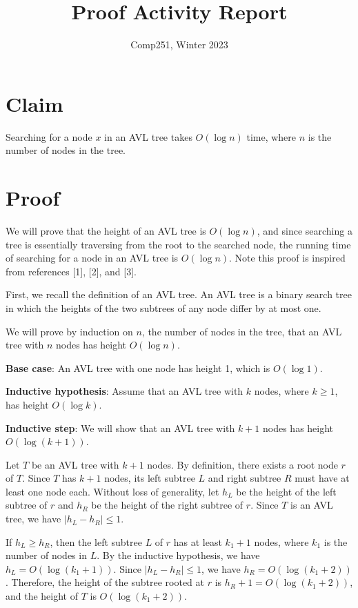 \documentclass[12pt]{article}
\title{Proof Activity Report}
\author{}
\date{Comp251, Winter 2023}
\begin{document}
\maketitle

\section*{Claim}
Searching for a node $x$ in an AVL tree takes $O(\log n)$ time, where $n$ is the number of nodes in the tree.

\section*{Proof}

We will prove that the height of an AVL tree is $O(\log n)$, and since searching a tree is essentially traversing from the root to the searched node, the running time of searching for a node in an AVL tree is $O(\log n)$. Note this proof is inspired from references [1], [2], and [3].

First, we recall the definition of an AVL tree. An AVL tree is a binary search tree in which the heights of the two subtrees of any node differ by at most one.

We will prove by induction on $n$, the number of nodes in the tree, that an AVL tree with $n$ nodes has height $O(\log n)$.

\textbf{Base case}: An AVL tree with one node has height 1, which is $O(\log 1)$.

\textbf{Inductive hypothesis}: Assume that an AVL tree with $k$ nodes, where $k\geq 1$, has height $O(\log k)$.

\textbf{Inductive step}: We will show that an AVL tree with $k+1$ nodes has height $O(\log (k+1))$.

Let $T$ be an AVL tree with $k+1$ nodes. By definition, there exists a root node $r$ of $T$. Since $T$ has $k+1$ nodes, its left subtree $L$ and right subtree $R$ must have at least one node each. Without loss of generality, let $h_L$ be the height of the left subtree of $r$ and $h_R$ be the height of the right subtree of $r$. Since $T$ is an AVL tree, we have $|h_L - h_R| \leq 1$.

If $h_L \geq h_R$, then the left subtree $L$ of $r$ has at least $k_1+1$ nodes, where $k_1$ is the number of nodes in $L$. By the inductive hypothesis, we have $h_L = O(\log(k_1+1))$. Since $|h_L - h_R| \leq 1$, we have $h_R = O(\log(k_1+2))$. Therefore, the height of the subtree rooted at $r$ is $h_R+1=O(\log(k_1+2))$, and the height of $T$ is $O(\log(k_1+2))$.
\end{document}
